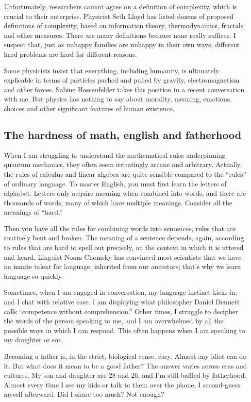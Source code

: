 \documentclass[a4paper]{article}
\begin{document}
Unfortunately, researchers cannot agree on a definition of complexity, which is crucial to their enterprise. Physicist Seth Lloyd has listed dozens of proposed definitions of complexity, based on information theory, thermodynamics, fractals and other measures. There are many definitions because none really suffices. I suspect that, just as unhappy families are unhappy in their own ways, different hard problems are hard for different reasons.

Some physicists insist that everything, including humanity, is ultimately explicable in terms of particles pushed and pulled by gravity, electromagnetism and other forces. Sabine Hossenfelder takes this position in a recent conversation with me. But physics has nothing to say about morality, meaning, emotions, choices and other significant features of human existence.
\subsection*{The hardness of math, english and fatherhood}
When I am struggling to understand the mathematical rules underpinning quantum mechanics, they often seem irritatingly arcane and arbitrary. Actually, the rules of calculus and linear algebra are quite sensible compared to the “rules” of ordinary language. To master English, you must first learn the letters of alphabet. Letters only acquire meaning when combined into words, and there are thousands of words, many of which have multiple meanings. Consider all the meanings of ``hard.''

Then you have all the rules for combining words into sentences, rules that are routinely bent and broken. The meaning of a sentence depends, again, according to rules that are hard to spell out precisely, on the context in which it is uttered and heard. Linguist Noam Chomsky has convinced most scientists that we have an innate talent for language, inherited from our ancestors; that’s why we learn language so quickly.

Sometimes, when I am engaged in conversation, my language instinct kicks in, and I chat with relative ease. I am displaying what philosopher Daniel Dennett calls ``competence without comprehension.'' Other times, I struggle to decipher the words of the person speaking to me, and I am overwhelmed by all the possible ways in which I can respond. This often happens when I am speaking to my daughter or son.

Becoming a father is, in the strict, biological sense, easy. Almost any idiot can do it. But what does it mean to be a good father? The answer varies across eras and cultures. My son and daughter are 28 and 26, and I’m still baffled by fatherhood. Almost every time I see my kids or talk to them over the phone, I second-guess myself afterward. Did I share too much? Not enough?
\end{document}
